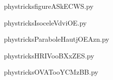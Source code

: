     

    \clearpage
    


    \newcommand{\CaptionFigfigureASkECWS}{<+Type your caption here+>}
    \begin{center}
        
    \end{center}
    phystricksfigureASkECWS.py

    

    \clearpage
    


    \newcommand{\CaptionFigIsoceleVdviOE}{<+Type your caption here+>}
    \begin{center}
        
    \end{center}
    phystricksIsoceleVdviOE.py

    

    \clearpage
    


    \newcommand{\CaptionFigParaboleHautjOEAzn}{<+Type your caption here+>}
    \begin{center}
        
    \end{center}
    phystricksParaboleHautjOEAzn.py

    

    \clearpage
    


    \newcommand{\CaptionFigHRIVooBXxZES}{<+Type your caption here+>}
    \begin{center}
        
    \end{center}
    phystricksHRIVooBXxZES.py

    

    \clearpage
    


    \newcommand{\CaptionFigOVATooYCMzBB}{<+Type your caption here+>}
    \begin{center}
        
    \end{center}
    phystricksOVATooYCMzBB.py

    

    \clearpage
    

